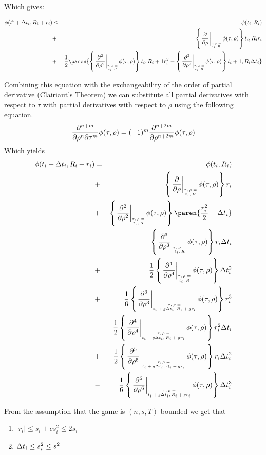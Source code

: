 \documentclass{article}[12pt]
\begin{document}
Which gives:

\begin{eqnarray} 
  \pot(t^i+\deltat_i,\R_i+r_i) &\leq& \pot(t_i,\R_i) \\
  &+&\at{\frac{\partial}{\partial \rho}}{t_i,R_i} r_i \\
                               &+& \frac{1}{2} \paren{\at{\frac{\partial^2}{\partial \rho^2}}{t_i,R_i+1}r_i^2
                                   - \at{\frac{\partial^2}{\partial \rho^2}}{t_i+1,R_i}\deltat_i}\\
\end{eqnarray}


Combining this equation with the exchangeability of the order of
partial derivative (Clairiaut's Theorem) we can substitute all
partial derivatives with respect to $\tau$ with partial derivatives
with respect to $\rho$ using the following equation.
\[
  \frac{\partial^{n+m}}{\partial \rho^n \partial \tau^m} \phi(\tau,\rho)=
  (-1)^m \frac{\partial^{n+2m}}{\partial \rho^{n+2m}} \phi(\tau,\rho)
\]
Which yields
\begin{eqnarray}
      \pot(t_i+\deltat_i,\R_i+r_i) & =&  
    \pot(t_i,\R_i)\\
    &+& \at{\frac{\partial}{\partial \rho}{}} r_i \label{term:coll1}\\
    &+& \at{\frac{\partial^2}{\partial \rho^2}} \paren{\frac{r_i^2}{2}-\deltat_i} \label{term:coll2}\\
    &-& \at{\frac{\partial^3}{\partial \rho^3}} r_i \deltat_i \label{term:coll3}\\
    &+& \frac{1}{2} \at{\frac{\partial^4}{\partial \rho^4}} \deltat_i^2 \label{term:coll4}\\
    &+& \frac{1}{6} \att{\frac{\partial^3}{\partial \rho^3}} r_i^3 \label{term:coll5}\\
    &-& \frac{1}{2} \att{\frac{\partial^4}{\partial \rho^4}} r_i^2\deltat_i \label{term:coll6}\\
    &+& \frac{1}{2} \att{\frac{\partial^5}{\partial \rho^5}} r_i\deltat_i^2 \label{term:coll7}\\
    &-& \frac{1}{6} \att{\frac{\partial^6}{\partial \rho^6}} \deltat_i^3 \label{term:coll8}
\end{eqnarray}

  From the assumption that the game is $(n,s,T)$-bounded we get that 
  \begin{enumerate}
  \item $|r_i| \leq s_i +c s_i^2 \leq 2 s_i$
  \item $\Delta t_i \leq s_i^2 \leq s^2$
  \end{enumerate}
\end{document}
